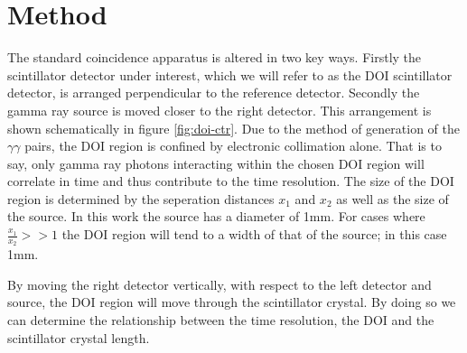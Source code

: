 \section{Method}
The standard coincidence apparatus is altered in two key ways. Firstly the scintillator detector under interest, which we will refer to as the DOI scintillator detector, is arranged perpendicular to the reference detector. Secondly the gamma ray source is moved closer to the right detector. This arrangement is shown schematically in figure \ref{fig:doi-ctr}. Due to the method of generation of the $\gamma\gamma$ pairs, the DOI region is confined by electronic collimation alone. That is to say, only gamma ray photons interacting within the chosen DOI region will correlate in time and thus  contribute to the time resolution. The size of the DOI region is determined by the seperation distances $x_1$ and $x_2$ as well as the size of the source. In this work the source has a diameter of 1mm. For cases where $\frac{x_1}{x_2}>>1$ the DOI region will tend to a width of that of the source; in this case 1mm.

By moving the right detector vertically, with respect to the left detector and source, the DOI region will move through the scintillator crystal. By doing so we can determine the relationship between the time resolution, the DOI and the scintillator crystal length.